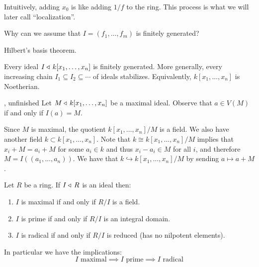 \documentclass[11pt,a4paper]{article}
\begin{document}
\begin{remark}
  Intuitively,
  adding $x_0$ is like adding $1/f$ to the ring.
  This process is what we will later call ``localization''.
\end{remark}

\begin{question}
  Why can we assume that $I = (f_1,\dots,f_m)$ is finitely generated?
\end{question}
\begin{solution}
  Hilbert's basis theorem.
\end{solution}

\begin{theorem}
  Every ideal $I \triangleleft\, k[x_1,\dots,x_n]$ is finitely generated.
  More generally, every increasing chain $I_1 \subseteq I_2 \subseteq \cdots $
  of ideals stabilizes.
  Equivalently, $k[x_1,\dots,x_n]$ is Noetherian.
\end{theorem}

\begin{proofof}{, unfinished}
  Let $M \triangleleft\, k[x_1,\dots,x_n]$ be a maximal ideal.
  Observe that $a \in V(M)$ if and only if $I(a) = M$.

  Since $M$ is maximal, the quotient $k[x_1,\dots,x_n] / M$ is a field.
  We also have another field $k \subset k[x_1,\dots,x_n]$.
  Note that $k \cong k[x_1,\dots,x_n] / M$ implies that
  $x_i + M = a_i + M$ for some $a_i \in k$ and thus $x_i - a_i \in M$
  for all $i$, and therefore $M = I((a_1,\dots,a_n))$.
  We have that $k \hookrightarrow k[x_1,\dots,x_n] / M$ by sending
  $a \mapsto a + M$.

\end{proofof}

\begin{remark}
  Let $R$ be a ring.
  If $I \triangleleft\, R$ is an ideal then:
  \begin{enumerate}
    \item[(1)] $I$ is maximal if and only if $R/I$ is a field.
    \item[(2)] $I$ is prime if and only if $R/I$ is an integral domain.
    \item[(3)] $I$ is radical if and only if $R/I$ is reduced (has no nilpotent elements).
  \end{enumerate}
  In particular we have the implications:
  \[
    I \text{ maximal} \implies
    I \text{ prime} \implies
    I \text{ radical}
  \]
\end{remark}
\end{document}
